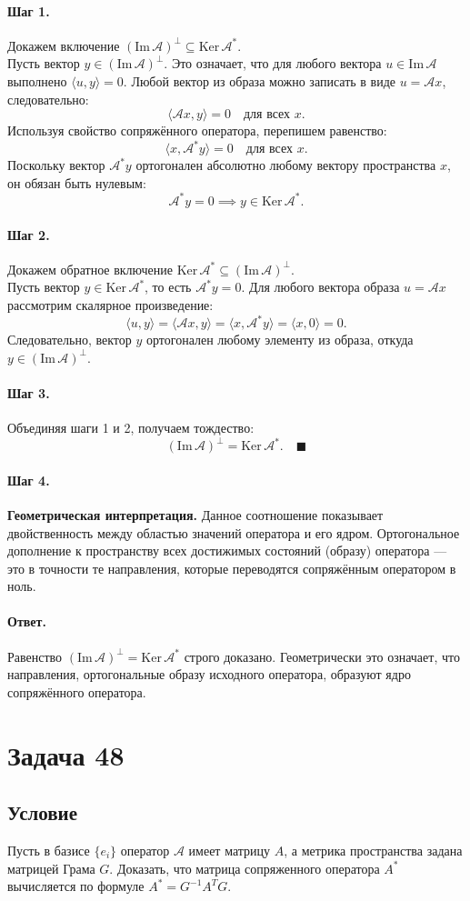 \documentclass[12pt,a4paper]{article}
\theoremstyle{solution}
\newcommand{\task}[1]{\newpage\section*{Задача #1}}
\newcommand{\answer}{\paragraph{Ответ.}}
\newcommand{\step}[1]{\paragraph{Шаг #1.}}
\begin{document}
\step{1} Докажем включение $(\mathrm{Im}\,\mathcal{A})^\perp \subseteq \mathrm{Ker}\,\mathcal{A}^*$. \\
Пусть вектор $y \in (\mathrm{Im}\,\mathcal{A})^\perp$. Это означает, что для любого вектора $u \in \mathrm{Im}\,\mathcal{A}$ выполнено $\langle u, y\rangle = 0$. Любой вектор из образа можно записать в виде $u = \mathcal{A}x$, следовательно:
\[
\langle \mathcal{A}x, y\rangle = 0 \quad \text{для всех } x.
\]
Используя свойство сопряжённого оператора, перепишем равенство:
\[
\langle x, \mathcal{A}^* y\rangle = 0 \quad \text{для всех } x.
\]
Поскольку вектор $\mathcal{A}^* y$ ортогонален абсолютно любому вектору пространства $x$, он обязан быть нулевым:
\[
\mathcal{A}^* y = 0 \implies y \in \mathrm{Ker}\,\mathcal{A}^*.
\]

\step{2} Докажем обратное включение $\mathrm{Ker}\,\mathcal{A}^* \subseteq (\mathrm{Im}\,\mathcal{A})^\perp$. \\
Пусть вектор $y \in \mathrm{Ker}\,\mathcal{A}^*$, то есть $\mathcal{A}^* y = 0$. 
Для любого вектора образа $u = \mathcal{A}x$ рассмотрим скалярное произведение:
\[
\langle u, y\rangle = \langle \mathcal{A}x, y\rangle = \langle x, \mathcal{A}^* y\rangle = \langle x, 0\rangle = 0.
\]
Следовательно, вектор $y$ ортогонален любому элементу из образа, откуда $y \in (\mathrm{Im}\,\mathcal{A})^\perp$.

\step{3} Объединяя шаги 1 и 2, получаем тождество:
\[
(\mathrm{Im}\,\mathcal{A})^\perp = \mathrm{Ker}\,\mathcal{A}^*. \quad\blacksquare
\]

\step{4} \textbf{Геометрическая интерпретация.} Данное соотношение показывает двойственность между областью значений оператора и его ядром. Ортогональное дополнение к пространству всех достижимых состояний (образу) оператора — это в точности те направления, которые переводятся сопряжённым оператором в ноль.

\answer
Равенство $(\mathrm{Im}\,\mathcal{A})^\perp = \mathrm{Ker}\,\mathcal{A}^*$ строго доказано. Геометрически это означает, что направления, ортогональные образу исходного оператора, образуют ядро сопряжённого оператора.

\task{48}
\subsection*{Условие}
Пусть в базисе $\{e_i\}$ оператор $\mathcal{A}$ имеет матрицу $A$, а метрика пространства задана матрицей Грама $G$. Доказать, что матрица сопряженного оператора $A^*$ вычисляется по формуле $A^* = G^{-1}A^TG$.
\end{document}
